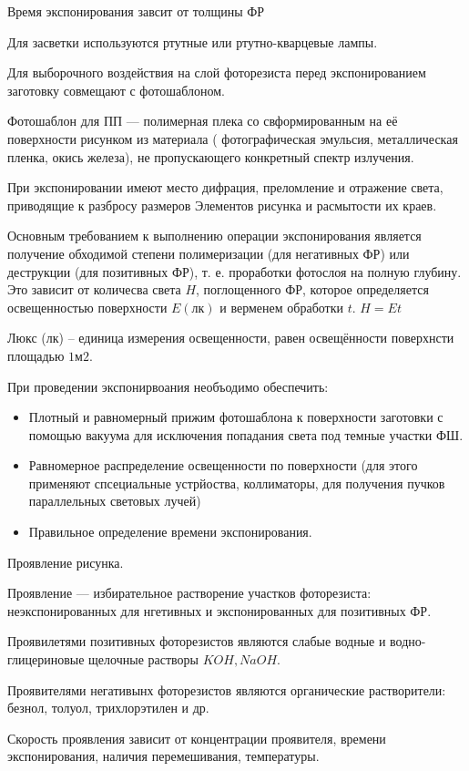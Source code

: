 \documentclass{article}
\begin{document}
Время экспонирования завсит от толщины ФР

Для засветки используются ртутные или ртутно-кварцевые лампы.

Для выборочного воздействия на слой фоторезиста перед экспонированием заготовку совмещают с фотошаблоном.

Фотошаблон для ПП --- полимерная плека со свформированным на её поверхности рисунком из материала ( фотографическая эмульсия, металлическая пленка, окись железа), не пропускающего конкретный спектр излучения.

При экспонировании имеют место дифрация, преломление и отражение света, приводящие к разбросу размеров Элементов рисунка и расмытости их краев.

Основным требованием к выполнению операции экспонирования является получение обходимой степени полимеризации (для негативных ФР) или деструкции (для позитивных ФР), т. е. проработки фотослоя на полную глубину. Это зависит от количесва света $H$, поглощенного ФР, которое определяется освещенностью поверхности $E (лк)$ и верменем обработки $t$. $H = E t$

Люкс (лк) -- единица измерения освещенности, равен освещённости поверхнсти площадью $1 м2$.

При проведении экспонирвоания необъодимо обеспечить:
\begin{itemize}
	\item Плотный и равномерный прижим фотошаблона к поверхности заготовки с помощью вакуума для исключения попадания света под темные участки ФШ.
	\item Равномерное распределение освещенности по поверхности (для этого применяют спсециальные устрйоства, коллиматоры, для получения пучков параллельных световых лучей)
	\item Правильное определение времени экспонирования.
\end{itemize}

Проявление рисунка.

Проявление --- избирательное растворение участков фоторезиста: неэкспонированных для нгетивных и экспонированных для позитивных ФР.

Проявилетями позитивных фоторезистов являются слабые водные и водно-глицериновые щелочные растворы $KOH, NaOH$.

Проявителями негативынх фоторезистов являются органические растворители: безнол, толуол, трихлорэтилен и др.

Скорость проявления зависит от концентрации проявителя, времени экспонирования, наличия перемешивания, температуры.
\end{document}
